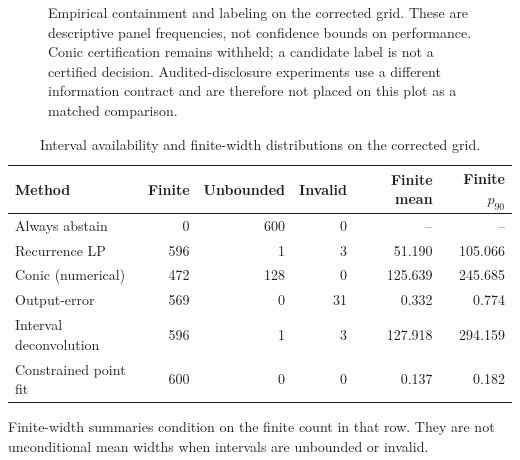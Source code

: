 \begin{figure}[htbp]\centering
{}
\caption{Empirical containment and labeling on the corrected grid. These are
descriptive panel frequencies, not confidence bounds on performance. Conic
certification remains withheld; a candidate label is not a certified decision.
Audited-disclosure experiments use a different information contract and are
therefore not placed on this plot as a matched comparison.}
\label{fig:comparator_frontier}\end{figure}

\begin{table}[htbp]\centering\small
\caption{Interval availability and finite-width distributions on the corrected grid.}
\label{tab:corrective_widths}
\begin{tabular*}{\textwidth}{@{\extracolsep{\fill}}lrrrrr@{}}
\toprule
Method & Finite & Unbounded & Invalid & Finite mean & Finite $p_{90}$ \\
\midrule
Always abstain & 0 & 600 & 0 & -- & -- \\
Recurrence LP & 596 & 1 & 3 & 51.190 & 105.066 \\
Conic (numerical) & 472 & 128 & 0 & 125.639 & 245.685 \\
Output-error & 569 & 0 & 31 & 0.332 & 0.774 \\
Interval deconvolution & 596 & 1 & 3 & 127.918 & 294.159 \\
Constrained point fit & 600 & 0 & 0 & 0.137 & 0.182 \\
\bottomrule\end{tabular*}
\par\smallskip\begin{minipage}{\textwidth}\footnotesize Finite-width summaries condition on the finite count in that row. They are not unconditional mean widths when intervals are unbounded or invalid.\end{minipage}
\end{table}


